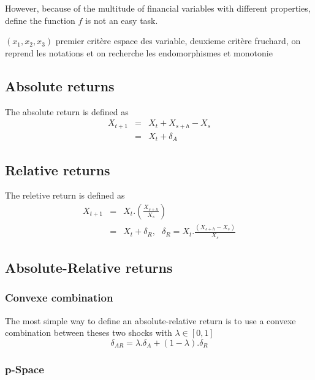 \documentclass[3pt]{article}
\begin{document}
\bigskip

However, because of the multitude of financial variables with different
properties, define the function $f$ is not an easy task.

\bigskip $(x_{1},x_{2},x_{3})$ premier crit\`{e}re espace des variable,
deuxieme crit\`{e}re fruchard, on reprend les notations et on recherche les
endomorphismes et monotonie

\subsection{Absolute returns}

The absolute return is defined as%
\begin{eqnarray*}
X_{t+1} &=&X_{t}+X_{s+h}-X_{s} \\
&=&X_{t}+\delta _{A}
\end{eqnarray*}

\subsection{Relative returns}

\bigskip The reletive return is defined as%
\begin{eqnarray*}
X_{t+1} &=&X_{t}.\left( \frac{X_{s+h}}{X_{s}}\right) \\
&=&X_{t}+\delta _{R},\text{ \ \ }\delta _{R}=X_{t}.\frac{\left(
X_{s+h}-X_{s}\right) }{X_{s}}
\end{eqnarray*}

\subsection{Absolute-Relative returns}

\bigskip

\subsubsection{Convexe combination}

The most simple way to define an absolute-relative return is to use a
convexe combination between theses two shocks with $\lambda \in \left[ 0,1%
\right] $ 
\begin{equation*}
\delta _{AR}=\lambda .\delta _{A}+(1-\lambda ).\delta _{R}
\end{equation*}

\subsubsection{p-Space}
\end{document}
